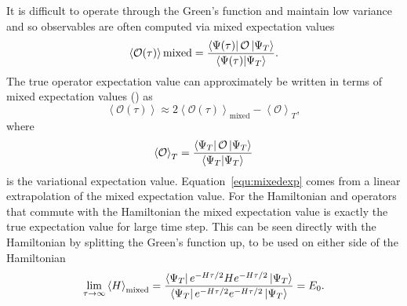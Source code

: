 It is difficult to operate through the Green's function and maintain low variance and so observables are often computed via mixed expectation values
\begin{equation}
   \left<\mathcal{O(\tau)}\right>\text{mixed} = \frac{\left< \Psi(\tau) \right|\mathcal{O}\left| \Psi_T \right>}{\left< \Psi(\tau) | \Psi_T \right>}.
\end{equation}
The true operator expectation value can approximately be written in terms of mixed expectation values (\cite{pudliner1997}) as
\begin{equation}
   \left<\mathcal{O(\tau)}\right> \approx 2\left<\mathcal{O(\tau)}\right>_\text{mixed} - \left<\mathcal{O}\right>_T,
   \label{equ:mixedexp}
\end{equation}
where
\begin{equation}
   \left<\mathcal{O}\right>_T = \frac{\left< \Psi_T \right|\mathcal{O}\left| \Psi_T \right>}{\left< \Psi_T | \Psi_T \right>}
\end{equation}
is the variational expectation value. Equation~\ref{equ:mixedexp} comes from a linear extrapolation of the mixed expectation value. For the Hamiltonian and operators that commute with the Hamiltonian the mixed expectation value is exactly the true expectation value for large time step. This can be seen directly with the Hamiltonian by splitting the Green's function up, to be used on either side of the Hamiltonian
\begin{equation}
   \lim\limits_{\tau\rightarrow\infty}\left<H\right>_\text{mixed} = \frac{\left< \Psi_T \right|e^{-H\tau/2}He^{-H\tau/2}\left| \Psi_T \right>}{\left< \Psi_T \right|e^{-H\tau/2}e^{-H\tau/2}\left| \Psi_T \right>} = E_0.
\end{equation}

